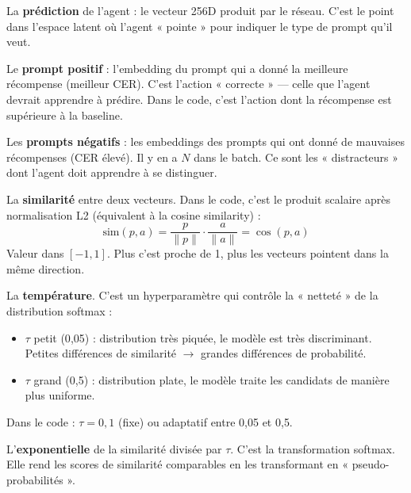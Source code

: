 \documentclass[11pt,a4paper]{article}
\begin{document}
\begin{description}[style=nextline, leftmargin=2cm]
    \item[$p$] La \textbf{prédiction} de l'agent : le vecteur 256D produit par le réseau. C'est le point dans l'espace latent où l'agent « pointe » pour indiquer le type de prompt qu'il veut.
    
    \item[$a^+$] Le \textbf{prompt positif} : l'embedding du prompt qui a donné la meilleure récompense (meilleur CER). C'est l'action « correcte » — celle que l'agent devrait apprendre à prédire. Dans le code, c'est l'action dont la récompense est supérieure à la baseline.
    
    \item[$a_j^-$] Les \textbf{prompts négatifs} : les embeddings des prompts qui ont donné de mauvaises récompenses (CER élevé). Il y en a $N$ dans le batch. Ce sont les « distracteurs » dont l'agent doit apprendre à se distinguer.
    
    \item[$\text{sim}(p, a)$] La \textbf{similarité} entre deux vecteurs. Dans le code, c'est le produit scalaire après normalisation L2 (équivalent à la cosine similarity) :
    \begin{equation}
    \text{sim}(p, a) = \frac{p}{\|p\|} \cdot \frac{a}{\|a\|} = \cos(p, a)
    \end{equation}
    Valeur dans $[-1, 1]$. Plus c'est proche de 1, plus les vecteurs pointent dans la même direction.
    
    \item[$\tau$] La \textbf{température}. C'est un hyperparamètre qui contrôle la « netteté » de la distribution softmax :
    \begin{itemize}
        \item $\tau$ petit (0{,}05) : distribution très piquée, le modèle est très discriminant. Petites différences de similarité $\rightarrow$ grandes différences de probabilité.
        \item $\tau$ grand (0{,}5) : distribution plate, le modèle traite les candidats de manière plus uniforme.
    \end{itemize}
    Dans le code : $\tau = 0{,}1$ (fixe) ou adaptatif entre 0{,}05 et 0{,}5.
    
    \item[$e^{\text{sim}/\tau}$] L'\textbf{exponentielle} de la similarité divisée par $\tau$. C'est la transformation softmax. Elle rend les scores de similarité comparables en les transformant en « pseudo-probabilités ».
    

\end{description}
\end{document}

